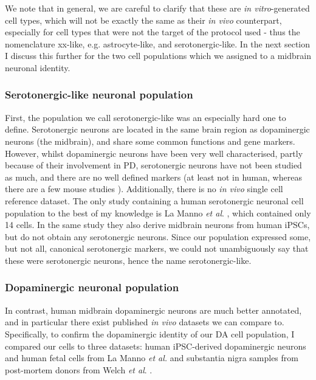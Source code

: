 We note that in general, we are careful to clarify that these are \textit{in vitro}-generated cell types, which will not be exactly the same as their \textit{in vivo} counterpart, especially for cell types that were not the target of the protocol used - thus the nomenclature xx-like, e.g. astrocyte-like, and serotonergic-like.
In the next section I discuss this further for the two cell populations which we assigned to a midbrain neuronal identity.

\subsubsection{Serotonergic-like neuronal population}

First, the population we call serotonergic-like was an especially hard one to define.
Serotonergic neurons are located in the same brain region as dopaminergic neurons 
(the midbrain), and share some common functions and gene markers.
However, whilst dopaminergic neurons have been very well characterised, partly because of their involvement in PD, serotonergic neurons have not been studied as much, and there are no well defined markers (at least not in human, whereas there are a few mouse studies \cite{cummings2019serotonergic}).
Additionally, there is no \textit{in vivo} single cell reference dataset.
The only study containing a human serotonergic neuronal cell population to the best of my knowledge is La Manno \textit{et al}. \cite{la2016molecular}, which contained only 14 cells.
In the same study they also derive midbrain neurons from human iPSCs, but do not obtain any serotonergic neurons.
Since our population expressed some, but not all, canonical serotonergic markers, we could not unambiguously say that these were serotonergic neurons, hence the name serotonergic-like.

\subsubsection{Dopaminergic neuronal population}

In contrast, human midbrain dopaminergic neurons are much better annotated, and in particular there exist published \textit{in vivo} datasets we can compare to.
Specifically, to confirm the dopaminergic identity of our DA cell population, I compared our cells to three datasets: human iPSC-derived dopaminergic neurons and human fetal cells from La Manno \textit{et al.} \cite{la2016molecular} and substantia nigra samples from post-mortem donors from Welch \textit{et al}. \cite{welch2019single}. \\

